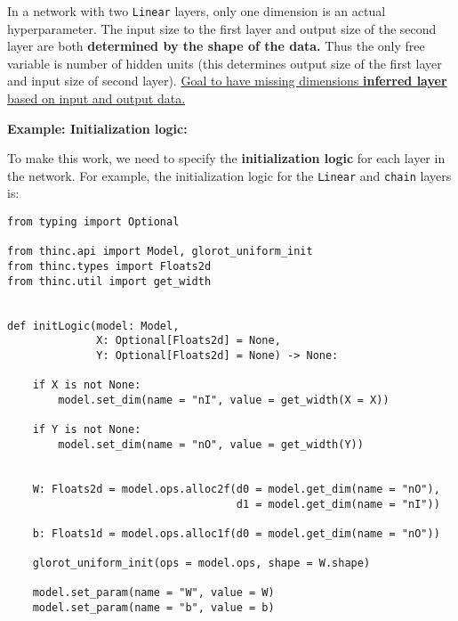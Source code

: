 \documentclass[
]{article}
\begin{document}
In a network with two \texttt{Linear} layers, only one
dimension is an actual hyperparameter. The input size to the first layer
and output size of the second layer are both \textbf{determined by the
shape of the data.} Thus the only free variable is number of hidden
units (this determines output size of the first layer and input size of
second layer).
\href{https://hyp.is/9PUiHk53EeqInoNDcqoGLw/thinc.ai/docs/concept}{Goal
to have missing dimensions \textbf{inferred layer} based on input and
output data.}

\textbf{Example: Initialization logic:}

To make this work, we need to specify the \textbf{initialization logic}
for each layer in the network. For example, the initialization logic for
the \texttt{Linear} and \texttt{chain}
layers is:

\begin{verbatim}
from typing import Optional

from thinc.api import Model, glorot_uniform_init
from thinc.types import Floats2d
from thinc.util import get_width


def initLogic(model: Model,
              X: Optional[Floats2d] = None,
              Y: Optional[Floats2d] = None) -> None:

    if X is not None:
        model.set_dim(name = "nI", value = get_width(X = X))

    if Y is not None:
        model.set_dim(name = "nO", value = get_width(Y))


    W: Floats2d = model.ops.alloc2f(d0 = model.get_dim(name = "nO"),
                                    d1 = model.get_dim(name = "nI"))

    b: Floats1d = model.ops.alloc1f(d0 = model.get_dim(name = "nO"))

    glorot_uniform_init(ops = model.ops, shape = W.shape)

    model.set_param(name = "W", value = W)
    model.set_param(name = "b", value = b)
\end{verbatim}
\end{document}
